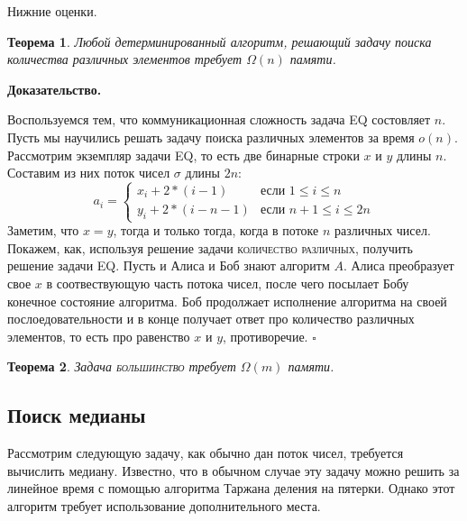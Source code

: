 \documentclass{article}
\newtheorem{theorem}{Теорема}
\newenvironment{proof}{\par\noindent%
{\bf Доказательство.\par\nopagebreak}}{\unskip\nobreak\enskip$\square$\par\bigskip}
\begin{document}
Нижние оценки.
\begin{theorem}
    Любой детерминированный алгоритм, решающий задачу поиска количества различных элементов
    требует $\Omega(n)$ памяти.
\end{theorem}

\begin{proof}
    Воспользуемся тем, что коммуникационная сложность задача \textsc{EQ} состовляет $n$.
    Пусть мы научились решать задачу поиска различных элементов за время $o(n)$.
    Рассмотрим экземпляр задачи \textsc{EQ}, то есть две бинарные строки $x$ и $y$ длины $n$.
    Составим из них поток чисел $\sigma$ длины $2n$:
    $$
        a_i = 
        \begin{cases}
            x_i + 2 * (i - 1) & \text{если $1 \leq i \leq n$} \\
            y_i + 2 * (i - n - 1) & \text{если $n + 1 \leq i \leq 2n$}
        \end{cases}
    $$
    Заметим, что $x = y$, тогда и только тогда, когда в потоке $n$ различных чисел.
    Покажем, как, используя решение задачи \textsc{количество различных}, получить решение задачи
    \textsc{EQ}. Пусть и Алиса и Боб знают алгоритм $A$. Алиса преобразует свое $x$ в
    соотвествующую часть потока чисел, после чего посылает Бобу конечное состояние алгоритма.
    Боб продолжает исполнение алгоритма на своей послоедовательности и в конце получает ответ про количество
    различных элементов, то есть про равенство $x$ и $y$, противоречие.
\end{proof}

\begin{theorem}
    Задача \textsc{большинство} требует $\Omega(m)$ памяти.
\end{theorem}



\subsection{Поиск медианы}

Рассмотрим следующую задачу, как обычно дан поток чисел, требуется
вычислить медиану. Известно, что в обычном случае эту задачу можно решить
за линейное время с помощью алгоритма Таржана деления на пятерки.
Однако этот алгоритм требует использование дополнительного места.
\end{document}
